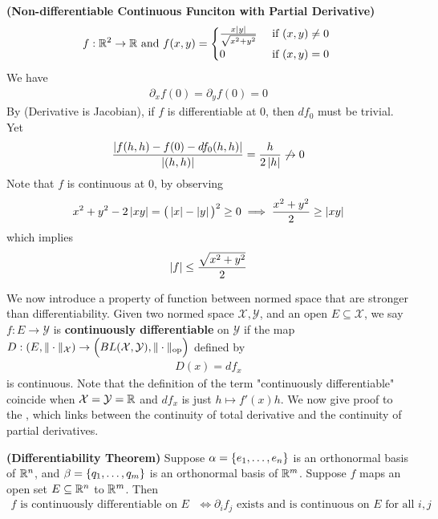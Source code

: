 \documentclass{report}
\begin{document}
\begin{Example}{\textbf{(Non-differentiable Continuous Funciton with Partial Derivative)}}{}
\begin{align*}
f:\mathbb{R}^2 \rightarrow \mathbb{R}\text{ and }f(x,y)=\begin{cases}
  \frac{x\left|y\right|}{\sqrt{x^2+y^2} }& \text{ if $(x,y)\neq 0$ }\\
  0& \text{ if $(x,y)=0$ }
\end{cases}
\end{align*}
We have 
\begin{align*}
\partial_xf(0)=\partial_yf(0)=0
\end{align*}
By  (Derivative is Jacobian), if $f$ is differentiable at $0$, then  $df_0$ must be trivial. Yet  
\begin{align*}
\frac{\left|f(h,h)-f(0)-df_0(h,h)\right|}{\left|(h,h)\right|}=\frac{h }{2\left|h\right| }\not\to 0 
\end{align*}
Note that $f$ is continuous at  $0$, by observing 
\begin{align*}
  x^2+y^2- 2\left|xy\right|=\big(\left|x\right|-\left|y\right| \big)^2\geq 0 \implies \frac{x^2+y^2}{2}\geq \left|xy\right|
\end{align*}
which implies 
\begin{align*}
\left|f\right|\leq \frac{\sqrt{x^2+y^2} }{2}
\end{align*}
\end{Example}
\begin{mdframed}
We now introduce a property of function between normed space that are stronger than differentiability. Given two normed space $\mathcal{X},\mathcal{Y}$, and an open $E\subseteq \mathcal{X}$, we say $f:E\rightarrow \mathcal{Y}$ is \textbf{continuously differentiable } on $\mathcal{Y}$ if the map $D:(E,\| \cdot \|_\mathcal{X})\rightarrow \Big(BL(\mathcal{X},\mathcal{Y}), \| \cdot \|_\text{op} \Big)$ defined by 
\begin{align*}
D(x)=df_x
\end{align*}
is continuous. Note that the definition of the term "continuously differentiable" coincide when $\mathcal{X}=\mathcal{Y}=\mathbb{R}$ and $df_x$ is just $h\mapsto f'(x)h$. We now give proof to the  , which links between the continuity of total derivative and the continuity of partial derivatives.
\end{mdframed}
\begin{theorem}
\label{DT}
\textbf{(Differentiability Theorem)} Suppose  $\alpha =\{ e_1,\dots ,e_n \}$ is an orthonormal basis of $\mathbb{R}^n$, and $\beta =\{ q_1,\dots ,q_m \}$ is an orthonormal basis of  $\mathbb{R}^m$. Suppose  $f$ maps an open set $E\subseteq\mathbb{R}^n$ to $\mathbb{R}^m$.  Then  
\begin{align*}
f\text{ is continuously differentiable on $E$ }\iff \partial_if_j\text{ exists and is continuous on $E$ for all $i,j$ }
\end{align*}
\end{theorem}
\end{document}
